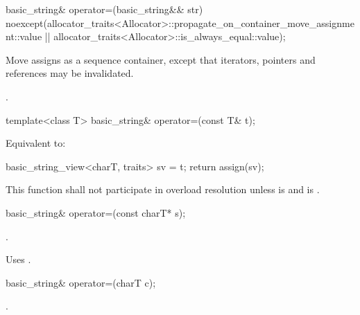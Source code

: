 %
\begin{itemdecl}
basic_string& operator=(basic_string&& str)
  noexcept(allocator_traits<Allocator>::propagate_on_container_move_assignment::value ||
           allocator_traits<Allocator>::is_always_equal::value);
\end{itemdecl}

\begin{itemdescr}
\pnum
\effects
Move assigns as a sequence container,
except that iterators, pointers and references may be invalidated.

\pnum
\returns
{}.
\end{itemdescr}

%
\begin{itemdecl}
template<class T>
  basic_string& operator=(const T& t);
\end{itemdecl}

\begin{itemdescr}
\pnum
\effects Equivalent to:
\begin{codeblock}
{
  basic_string_view<charT, traits> sv = t;
  return assign(sv);
}
\end{codeblock}

\pnum
\remarks This function shall not participate in overload resolution unless
 is  and
 is .
\end{itemdescr}

%
\begin{itemdecl}
basic_string& operator=(const charT* s);
\end{itemdecl}

\begin{itemdescr}
\pnum
\returns
{}.

\pnum
\remarks
Uses
%
.
\end{itemdescr}

%
\begin{itemdecl}
basic_string& operator=(charT c);
\end{itemdecl}

\begin{itemdescr}
\pnum
\returns
{}.
\end{itemdescr}

